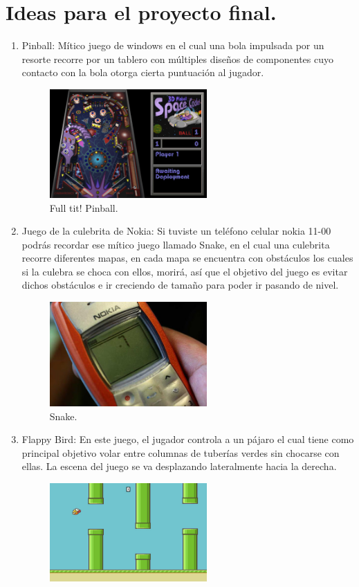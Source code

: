 \documentclass{article}
\begin{document}
\section{Ideas para el proyecto final.} \label{contenido}
\begin{enumerate}
  \item {Pinball:} Mítico juego de windows en el cual una bola impulsada por un resorte recorre por un tablero con múltiples diseños de componentes cuyo contacto con la bola otorga cierta puntuación al jugador.
  \begin{figure}[h]
  \includegraphics[width=6cm]{pinball.png}
  \centering
  \caption{Full tit! Pinball.}
  \label{fig:pinball}
  \end{figure}
  \item {Juego de  la culebrita de Nokia:} Si tuviste un teléfono celular nokia 11-00 podrás recordar ese mítico juego llamado Snake, en el cual una culebrita recorre diferentes mapas, en cada mapa se encuentra con obstáculos los cuales si la culebra se choca con ellos, morirá, así que el objetivo del juego es evitar dichos obstáculos e ir creciendo de tamaño para poder ir pasando de nivel.
  \begin{figure}[h]
  \includegraphics[width=6cm]{snake.jpg}
  \centering
  \caption{Snake.}
  \label{fig:snake}
  \end{figure}
  \item {Flappy Bird: }En este juego, el jugador controla a un pájaro el cual tiene como principal objetivo volar entre columnas de tuberías verdes sin chocarse con ellas. La escena del juego se va desplazando lateralmente hacia la derecha.
  \begin{figure}[h]
  \includegraphics[width=6cm]{flappy_bird.jpg}

\end{figure}
\end{enumerate}
\end{document}
